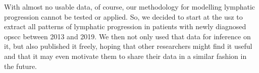 \documentclass[\relativeRoot/main.tex]{subfiles}
\begin{document}
With almost no usable data, of course, our methodology for modelling lymphatic progression cannot be tested or applied. So, we decided to start at the \gls{usz} to extract all patterns of lymphatic progression in patients with newly diagnosed \gls{opscc} between 2013 and 2019. We then not only used that data for inference on it, but also published it freely, hoping that other researchers might find it useful and that it may even motivate them to share their data in a similar fashion in the future.






\end{document}
